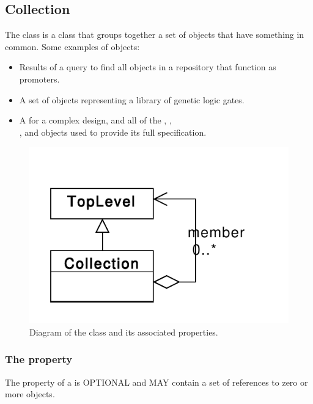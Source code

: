 \subsection {Collection}
\label{sec:Collection}
The  class is a class that groups together a set of  objects that have something in common.
Some examples of  objects:
\begin{itemize}
\item Results of a query to find all  objects in a repository that function as promoters.
\item A set of  objects representing a library of genetic logic gates.
\item A  for a complex design, and all of the , ,\\ , and  objects used to provide its full specification.
\end{itemize}

\begin{figure}[ht]
\begin{center}
\includegraphics[scale=0.6]{uml/collection}
\caption[]{Diagram of the  class and its associated properties.}
\label{uml:collection}
\end{center}
\end{figure}

\subsubsection*{The  property}\label{sec:members}
The  property of a  is OPTIONAL and MAY contain a set of  references to zero or more  objects.

